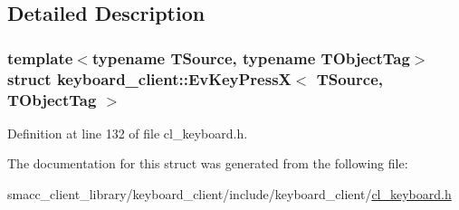 \subsection{Detailed Description}
\subsubsection*{template$<$typename T\+Source, typename T\+Object\+Tag$>$\newline
struct keyboard\+\_\+client\+::\+Ev\+Key\+Press\+X$<$ T\+Source, T\+Object\+Tag $>$}



Definition at line 132 of file cl\+\_\+keyboard.\+h.



The documentation for this struct was generated from the following file\+:\begin{DoxyCompactItemize}
\item 
smacc\+\_\+client\+\_\+library/keyboard\+\_\+client/include/keyboard\+\_\+client/\hyperlink{cl__keyboard_8h}{cl\+\_\+keyboard.\+h}\end{DoxyCompactItemize}
